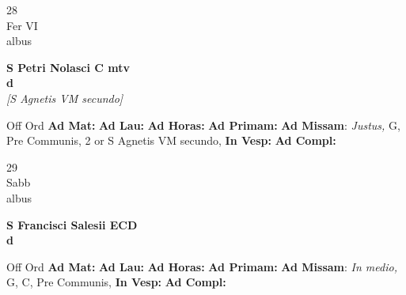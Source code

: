 \documentclass[10pt, openany]{book}
\begin{document}
    \begin{center}
        \begin{minipage}{3.5in}
            \vspace{2em}
            \begin{minipage}{0.5in}
                {\Huge 28} \\
                {\normalsize Fer VI} \\
                {\normalsize albus}
            \end{minipage}
            \begin{minipage}{3.0in}
                \textbf{ \large S Petri Nolasci C mtv \\
                \textnormal{\normalsize d}} \\ \textit{[S Agnetis VM secundo]} \\ 
            \end{minipage}
            \begin{justify}Off Ord
                \textbf{Ad Mat: }
                \textbf{Ad Lau: }
                \textbf{Ad Horas: }
                \textbf{Ad Primam: }\textbf{Ad Missam}: \textit{Justus,} G, Pre Communis, 2 or S Agnetis VM secundo,  
                \textbf{In Vesp: }
                \textbf{Ad Compl: }
            \end{justify}
        \end{minipage}
    \end{center}

    \begin{center}
        \begin{minipage}{3.5in}
            \vspace{2em}
            \begin{minipage}{0.5in}
                {\Huge 29} \\
                {\normalsize Sabb} \\
                {\normalsize albus}
            \end{minipage}
            \begin{minipage}{3.0in}
                \textbf{ \large S Francisci Salesii ECD \\
                \textnormal{\normalsize d}} \\ 
            \end{minipage}
            \begin{justify}Off Ord
                \textbf{Ad Mat: }
                \textbf{Ad Lau: }
                \textbf{Ad Horas: }
                \textbf{Ad Primam: }\textbf{Ad Missam}: \textit{In medio,} G, C, Pre Communis,  
                \textbf{In Vesp: }
                \textbf{Ad Compl: }
            \end{justify}
        \end{minipage}
    \end{center}
\end{document}
